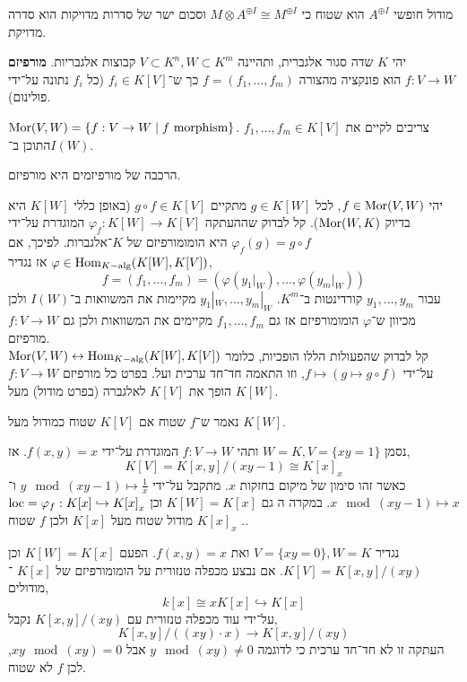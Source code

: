 \begin{example}
	מודול חופשי $A^{\oplus I}$ הוא שטוח כי $M \otimes A^{\oplus I} \cong M^{\oplus I}$ וסכום ישר של סדרות מדויקות הוא סדרה מדויקת.
\end{example}
\begin{definition}
	יהי $K$ שדה סגור אלגברית, ותהיינה $V \subset K^n, W \subset K^m$ קבוצות אלגבריות.
	\textbf{מורפיזם} $f : V \to W$ הוא פונקציה מהצורה $f = (f_1, \ldots, f_m)$ כך ש־$f_i \in K[V]$ (כל $f_i$ נתונה על־ידי פולינום).
\end{definition}
\begin{notation}
	$\operatorname{Mor}(V, W) = \{ f : V \to W \mid f \text{ morphism} \}$.
	$f_1, \ldots, f_m \in K[V]$ צריכים לקיים את התוכן ב־$I(W)$.
\end{notation}
\begin{remark}
	הרכבה של מורפיזמים היא מורפיזם.
\end{remark}
יהי $f \in \operatorname{Mor}(V, W)$, לכל $g \in K[W]$ מתקיים $g \circ f \in K[V]$ (באופן כללי $K[W]$ היא בדיוק $\operatorname{Mor}(W, K)$).
קל לבדוק שההעתקה $\varphi_f : K[W] \to K[V]$ המוגדרת על־ידי $\varphi_f(g) = g \circ f$ היא הומומורפיזם של $K$־אלגברות.
לפיכך, אם $\varphi \in \operatorname{Hom}_{K-\text{alg}}(K[W], K[V])$ אז נגדיר,
\[
	f
	= (f_1, \ldots, f_m)
	= (\varphi(y_1 |_W), \ldots, \varphi(y_m |_W))
\]
עבור $y_1, \ldots, y_m$ קורדינטות ב־$K^m$.
$y_1 |_W, \ldots, y_m |_W$ מקיימות את המשוואות ב־$I(W)$ ולכן מכיוון ש־$\varphi$ הומומורפיזם אז גם $f_1, \ldots, f_m$ מקיימים את המשוואות ולכן גם $f : V \to W$ מורפיזם. \\
קל לבדוק שהפעולות הללו הופכיות, כלומר $\operatorname{Mor}(V, W) \leftrightarrow \operatorname{Hom}_{K-\text{alg}}(K[W], K[V])$ על־ידי $f \mapsto (g \mapsto g \circ f)$, וזו התאמה חד־חד ערכית ועל.
בפרט כל מורפיזם $f : V \to W$ הופך את $K[V]$ לאלגברה (בפרט מודול) מעל $K[W]$.
\begin{notation}
	נאמר ש־$f$ שטוח אם $K[V]$ שטוח כמודול מעל $K[W]$.
\end{notation}
\begin{example}
	נסמן $W = K, V = \{ x y = 1 \}$ ותהי $f : V \to W$ המוגדרת על־ידי $f(x, y) = x$.
	אז,
	\[
		K[V]
		= K[x, y] / (x y - 1)
		\cong {K[x]}_x
	\]
	כאשר זהו סימון של מיקום בחזקות $x$.
	מתקבל על־ידי $y \mod (x y - 1) \mapsto \frac{1}{x}$ ו־$x \mod (x y - 1) \mapsto x$.
	במקרה ה גם $K[W] = K[x]$ וכן $\operatorname{loc} = \varphi_f : K[x] \hookrightarrow {K[x]}_x$.
	${K[x]}_x$ מודול שטוח מעל $K[x]$ ולכן $f$ שטוח.
\end{example}
\begin{example}
	נגדיר $V = \{ x y = 0 \}, W = K$ ואת $f(x, y) = x$.
	הפעם $K[W] = K[x]$ וכן $K[V] = K[x, y] / (x y)$.
	אם נבצע מכפלה טנזורית על הומומורפיזם של $K[x]$ ־מודולים,
	\[
		k[x] \cong x K[x] \hookrightarrow K[x]
	\]
	על־ידי עוד מכפלה טנזורית עם $K[x, y] / (x y)$ נקבל,
	\[
		K[x, y] / ((x y) \cdot x)
		\to K[x, y] / (x y)
	\]
	העתקה זו לא חד־חד ערכית כי לדוגמה $y \mod (x y) \ne 0$ אבל $x y \mod (x y) = 0$, לכן $f$ לא שטוח.
\end{example}

